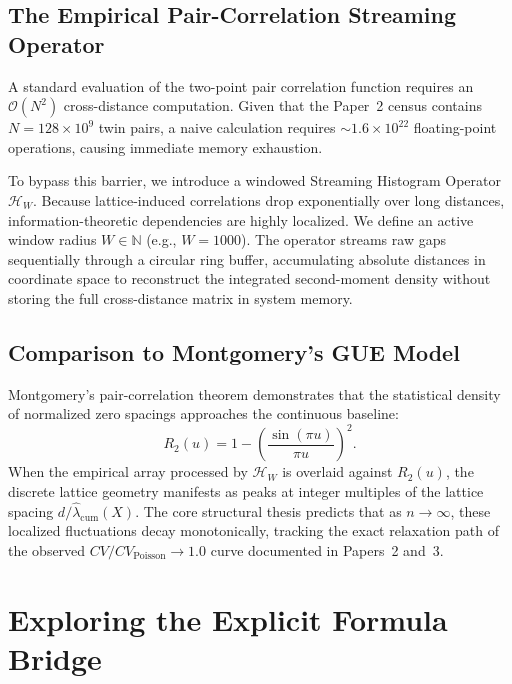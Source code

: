 \documentclass[11pt]{article}
\theoremstyle{remark}
\begin{document}
\subsection{The Empirical Pair-Correlation Streaming Operator}
A standard evaluation of the two-point pair correlation function requires an $\mathcal{O}(N^2)$ cross-distance computation. Given that the Paper~2 census contains $N = 128 \times 10^9$ twin pairs, a naive calculation requires $\sim 1.6 \times 10^{22}$ floating-point operations, causing immediate memory exhaustion.

To bypass this barrier, we introduce a windowed Streaming Histogram Operator $\mathcal{H}_W$. Because lattice-induced correlations drop exponentially over long distances, information-theoretic dependencies are highly localized. We define an active window radius $W \in \mathbb{N}$ (e.g., $W = 1000$). The operator streams raw gaps sequentially through a circular ring buffer, accumulating absolute distances in coordinate space to reconstruct the integrated second-moment density without storing the full cross-distance matrix in system memory.

\subsection{Comparison to Montgomery's GUE Model}
Montgomery's pair-correlation theorem demonstrates that the statistical density of normalized zero spacings approaches the continuous baseline:
\begin{equation}
    R_2(u) = 1 - \left(\frac{\sin(\pi u)}{\pi u}\right)^2.
\end{equation}
When the empirical array processed by $\mathcal{H}_W$ is overlaid against $R_2(u)$, the discrete lattice geometry manifests as peaks at integer multiples of the lattice spacing $d/\hat{\lambda}_{\mathrm{cum}}(X)$. The core structural thesis predicts that as $n \to \infty$, these localized fluctuations decay monotonically, tracking the exact relaxation path of the observed $CV/CV_{\mathrm{Poisson}} \to 1.0$ curve documented in Papers~2 and~3.

\section{Exploring the Explicit Formula Bridge}
\end{document}
